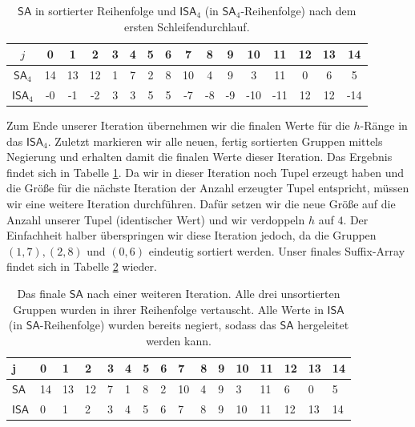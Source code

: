 \begin{table}[]
\small
\begin{tabular}{|c|c|c|c|c|c|c|c|c|c|c|c|c|c|c|c|}
\hline
$j$                              & 0  & 1  & 2  & 3 & 4 & 5 & 6 & 7  & 8 & 9  & 10  & 11  & 12 & 13 & 14  \\ \hline
$\mathsf{SA}_4$               & 14 & 13 & 12 & 1 & 7 & 2 & 8 & 10 & 4 & 9  & 3   & 11  & 0  & 6  & 5   \\ \hline
$\mathsf{ISA}_4$ & -0 & -1 & -2 & 3 & 3 & 5 & 5 & -7  & -8 & -9 & -10 & -11 & 12 & 12 & -14 \\ \hline
\end{tabular}
\caption{$\mathsf{SA}$ in sortierter Reihenfolge und $\mathsf{ISA}_4$ (in $\mathsf{SA}_4$-Reihenfolge) nach dem ersten Schleifendurchlauf.}
\label{tab:osipov-iteration}
\end{table}

Zum Ende unserer Iteration übernehmen wir die finalen Werte für die $h$-Ränge in das $\mathsf{ISA}_4$. Zuletzt markieren wir alle neuen, fertig sortierten Gruppen mittels Negierung und erhalten damit die finalen Werte dieser Iteration. Das Ergebnis findet sich in Tabelle \ref{tab:osipov-iteration}. Da wir in dieser Iteration noch Tupel erzeugt haben und die Größe für die nächste Iteration der Anzahl erzeugter Tupel entspricht, müssen wir eine weitere Iteration durchführen. Dafür setzen wir die neue Größe auf die Anzahl unserer Tupel (identischer Wert) und wir verdoppeln $h$ auf $4$. Der Einfachheit halber überspringen wir diese Iteration jedoch, da die Gruppen $(1, 7), (2,8)$ und $(0,6)$ eindeutig sortiert werden. Unser finales Suffix-Array findet sich in Tabelle \ref{tab:osipov-final} wieder.

\begin{table}[]
\small
\begin{tabular}{|l|l|l|l|l|l|l|l|l|l|l|l|l|l|l|l|}
\hline
j                              & 0  & 1  & 2  & 3  & 4  & 5  & 6  & 7  & 8  & 9  & 10  & 11  & 12  & 13  & 14  \\ \hline
$\mathsf{SA}$               & 14 & 13 & 12 & 7  & 1  & 8  & 2  & 10 & 4  & 9  & 3   & 11  & 6   & 0   & 5   \\ \hline
$\mathsf{ISA}$ & 0 & 1 & 2 & 3 & 4 & 5 & 6 & 7 & 8 & 9 & 10 & 11 & 12 & 13 & 14 \\ \hline
\end{tabular}
\caption{Das finale $\mathsf{SA}$ nach einer weiteren Iteration. Alle drei unsortierten Gruppen wurden in ihrer Reihenfolge vertauscht. Alle Werte in $\mathsf{ISA}$ (in $\mathsf{SA}$-Reihenfolge) wurden bereits negiert, sodass das $\mathsf{SA}$ hergeleitet werden kann.}
\label{tab:osipov-final}
\end{table}

